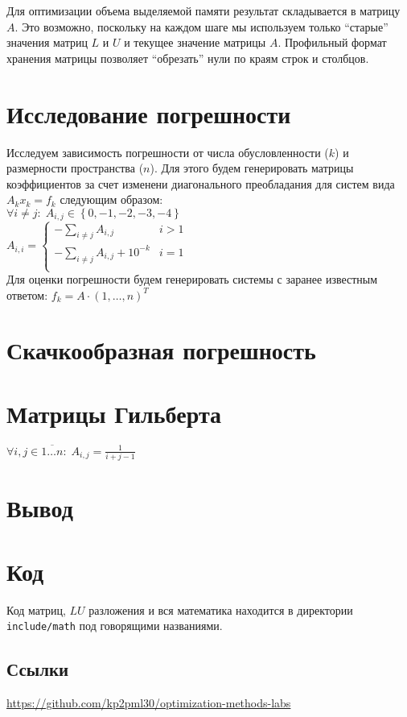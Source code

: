 \documentclass[russian, english]{article}
\begin{document}
Для оптимизации объема выделяемой памяти результат складывается в матрицу $A$. Это возможно, поскольку на каждом шаге мы используем только ``старые'' значения матриц $L$ и $U$ и текущее значение матрицы $A$. Профильный формат хранения матрицы позволяет ``обрезать'' нули по краям строк и столбцов.

\section{Исследование погрешности}
Исследуем зависимость погрешности от числа обусловленности ($k$) и размерности пространства ($n$). Для этого будем генерировать матрицы коэффициентов за счет изменени диагонального преобладания для систем вида $A_kx_k=f_k$ следующим образом:\\
$\forall i\neq j:\; A_{i, j}\in\left\{0, -1, -2, -3, -4\right\}$\\
$A_{i,i}=\begin{cases}
-\sum_{i\neq j}A_{i, j} & i > 1\\
-\sum_{i\neq j}A_{i, j} + 10^{-k} & i = 1\\
\end{cases}$\\
Для оценки погрешности будем генерировать системы с заранее известным ответом: $f_k=A\cdot (1,\dots,n)^T$
\section{Скачкообразная погрешность}
\section{Матрицы Гильберта}
$\forall i,j\in\overline{1\dots n}:\; A_{i,j}=\frac{1}{i+j-1}$

\section{Вывод}

\newpage
\appendix
\section{Код}
Код матриц, $LU$ разложения и вся математика находится в директории \texttt{include/math} под говорящими названиями.
\subsection{Ссылки}
\url{https://github.com/kp2pml30/optimization-methods-labs}
\end{document}
